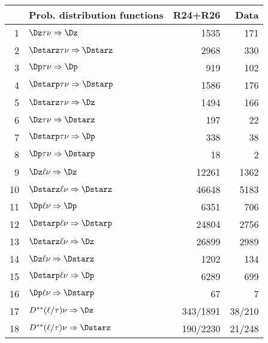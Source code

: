 \documentclass[6pt]{article}
\begin{document}
 



\begin{tabular}{r l r r }\\ \hline\hline
     & \multicolumn{1}{c}{\bf Prob. distribution functions}  & R24+R26 & Data \\ \hline
1    & $\Dz\tau\nu\Rightarrow\Dz$                             &  1535	     &   171	       \\
2    & $\Dstarz\tau\nu\Rightarrow\Dstarz$                     &  2968	     &   330	       \\
3    & $\Dp\tau\nu\Rightarrow\Dp$                             &  919	     &   102	       \\
4    & $\Dstarp\tau\nu\Rightarrow\Dstarp$                     &  1586	     &   176	       \\
5    & $\Dstarz\tau\nu\Rightarrow\Dz$                         &  1494	     &   166	       \\
6    & $\Dz\tau\nu\Rightarrow\Dstarz$                         &  197	     &   22	       \\
7    & $\Dstarp\tau\nu\Rightarrow\Dp$                         &  338	     &   38	       \\
8    & $\Dp\tau\nu\Rightarrow\Dstarp$                         &  18	     &   2	       \\
9    & $\Dz\ell\nu\Rightarrow\Dz$                             &  12261	     &   1362	       \\
10   & $\Dstarz\ell\nu\Rightarrow\Dstarz$                     &  46648	     &   5183	       \\
11   & $\Dp\ell\nu\Rightarrow\Dp$                             &  6351	     &   706	       \\
12   & $\Dstarp\ell\nu\Rightarrow\Dstarp$                     &  24804	     &   2756	       \\
13   & $\Dstarz\ell\nu\Rightarrow\Dz$                         &  26899	     &   2989	       \\
14   & $\Dz\ell\nu\Rightarrow\Dstarz$                         &  1202	     &   134	       \\
15   & $\Dstarp\ell\nu\Rightarrow\Dp$                         &  6289	     &   699	       \\
16   & $\Dp\ell\nu\Rightarrow\Dstarp$                         &  67	     &   7	       \\
17   & $D^{**}(\ell/\tau)\nu\Rightarrow\Dz$                   &  343/1891    &   38/210	       \\
18   & $D^{**}(\ell/\tau)\nu\Rightarrow\Dstarz$               &  190/2230    &   21/248	       \\

\end{tabular}
\end{document}
